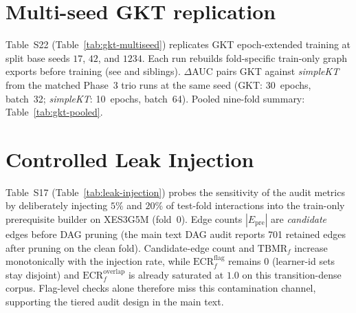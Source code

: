 \documentclass[pdflatex,sn-mathphys-num]{sn-jnl}
\newcommand{\Epre}{\ensuremath{E_{\text{pre}}}}
\begin{document}
\section{Multi-seed GKT replication}
\label{sec:supp-gkt-multiseed}
Table~S22 (Table~\ref{tab:gkt-multiseed}) replicates GKT epoch-extended training
at split base seeds $17$, $42$, and $1234$. Each run rebuilds fold-specific
train-only graph exports before training (see  and siblings).
$\Delta$AUC pairs GKT against \textit{simpleKT} from the matched Phase~3 trio
runs at the same seed (GKT: 30~epochs, batch~32; \textit{simpleKT}: 10~epochs,
batch~64). Pooled nine-fold summary: Table~\ref{tab:gkt-pooled}.
\begin{table}[h!]
\centering
\caption{GKT epoch-extended vs.\ \textit{simpleKT} by split seed (Table S22)}
\label{tab:gkt-multiseed}

\end{table}
\begin{table}[h!]
\centering
\caption{Pooled nine-fold $\Delta$AUC summary (Table S22, continued)}
\label{tab:gkt-pooled}

\end{table}

\section{Controlled Leak Injection}
\label{sec:supp-leak-injection}
Table~S17 (Table~\ref{tab:leak-injection}) probes the sensitivity of the
audit metrics by deliberately injecting $5\%$ and $20\%$ of test-fold
interactions into the train-only prerequisite builder on XES3G5M (fold~0).
Edge counts $|\Epre|$ are \emph{candidate} edges before DAG pruning (the
main text DAG audit reports 701 retained edges after pruning on the clean
fold). Candidate-edge count and $\mathrm{TBMR}_f$ increase monotonically with the
injection rate, while $\mathrm{ECR}^{\mathrm{flag}}_f$ remains $0$ (learner-id
sets stay disjoint) and $\mathrm{ECR}^{\mathrm{overlap}}_f$ is already
saturated at $1.0$ on this transition-dense corpus. Flag-level checks alone
therefore miss this contamination channel, supporting the tiered audit design
in the main text.
\begin{table}[h!]
\centering
\caption{Controlled Leak Injection, XES3G5M fold~0. $|\Epre|$ counts candidate edges before DAG pruning. (Table S17)}
\label{tab:leak-injection}

\end{table}
\end{document}

